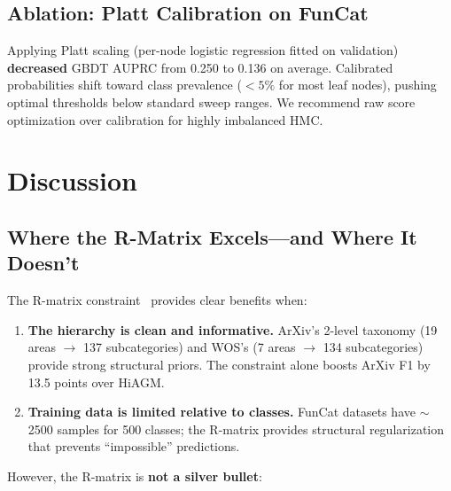 \documentclass[11pt,a4paper]{article}
\begin{document}
\subsection{Ablation: Platt Calibration on FunCat}

Applying Platt scaling (per-node logistic regression fitted on
validation) \textbf{decreased} GBDT AUPRC from 0.250 to 0.136 on
average. Calibrated probabilities shift toward class prevalence
($<5\%$ for most leaf nodes), pushing optimal thresholds below
standard sweep ranges. We recommend raw score optimization over
calibration for highly imbalanced HMC.

\section{Discussion}
\label{sec:discussion}

\subsection{Where the R-Matrix Excels---and Where It Doesn't}

The R-matrix constraint~\cite{giunchiglia2018hmc} provides clear
benefits when:

\begin{enumerate}[leftmargin=*,nosep]
  \item \textbf{The hierarchy is clean and informative.} ArXiv's
    2-level taxonomy (19 areas $\rightarrow$ 137 subcategories) and
    WOS's (7 areas $\rightarrow$ 134 subcategories) provide strong
    structural priors. The constraint alone boosts ArXiv F1 by 13.5
    points over HiAGM.
  \item \textbf{Training data is limited relative to classes.} FunCat
    datasets have $\sim$2500 samples for 500 classes; the R-matrix
    provides structural regularization that prevents ``impossible''
    predictions.
\end{enumerate}

However, the R-matrix is \textbf{not a silver bullet}:
\end{document}
